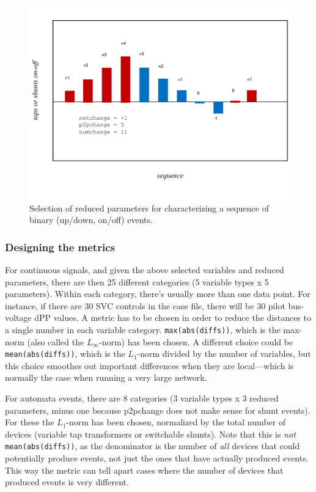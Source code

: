 \documentclass[conference]{IEEEtran}
\newcommand{\code}[1]{\texttt{#1}}
\begin{document}
\begin{figure}
  \centering
  \includegraphics[width=\columnwidth]{figs/transient_characteristics_2}
  \caption{Selection of reduced parameters for characterizing a
    sequence of binary (up/down, on/off) events.}
  \label{fig:tcharacteristics2}
\end{figure}


\subsubsection{Designing the metrics}
\label{sssec:metrics}
For continuous signals, and given the above selected variables and reduced
parameters, there are then 25 different categories (5 variable types x 5
parameters). Within each category, there's usually more than one data point. For
instance, if there are 30 SVC controls in the case file, there will be 30 pilot
bus-voltage dPP values. A metric has to be chosen in order to reduce the
distances to a single number in each variable category. \code{max(abs(diffs))}, which is the max-norm (also called the
$L_\infty$-norm) has been chosen.  A different choice could be \code{mean(abs(diffs))}, which is
the $L_1$-norm divided by the number of variables, but this choice smoothes out
important differences when they are local---which is normally the case when
running a very large network.

For automata events, there are 8 categories (3 variable types x 3 reduced
parameters, minus one because p2pchange does not make sense for shunt
events). For these the $L_1$-norm has been chosen, normalized by the total number
of devices (variable tap transformers or switchable shunts). Note that this is
\emph{not} \code{mean(abs(diffs))}, as the denominator is the number of
\emph{all} devices that could potentially produce events, not just the ones that
have actually produced events. This way the metric can tell apart cases where
the number of devices that produced events is very different.
\end{document}
